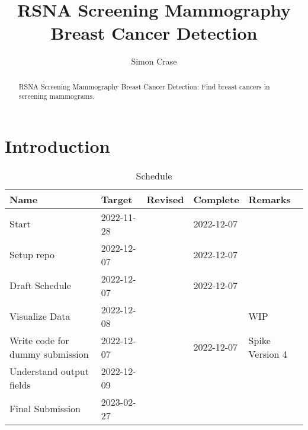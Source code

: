 \documentclass[]{article}
\title{RSNA Screening Mammography Breast Cancer Detection}
\author{Simon Crase}
\begin{document}
\maketitle

\begin{abstract}
RSNA Screening Mammography Breast Cancer Detection: Find breast cancers in screening mammograms. \cite{rsna-breast-cancer-detection}
\end{abstract}

\setcounter{tocdepth}{2}
\tableofcontents
\listoftables
\section{Introduction}
\begin{table}[H]
	\begin{center}
		\caption{Schedule}
		\begin{tabular}{|l|l|l|l|l|} \hline
			Name&Target&Revised&Complete&Remarks \\  \hline
			Start&2022-11-28&&2022-12-07&\\ 		 \hline
			Setup repo&2022-12-07&&2022-12-07&\\ 		 \hline
			Draft Schedule&2022-12-07&&2022-12-07&\\ 		 \hline
			Visualize Data&2022-12-08&&&WIP\\ 		 \hline
			Write code for dummy submission&2022-12-07&&2022-12-07&Spike Version 4\\ 		 \hline
			Understand output fields&2022-12-09&&&\\ \hline
			Final Submission&2023-02-27&&&\\ 		 \hline
		\end{tabular}
	\end{center}
\end{table}
\end{document}
